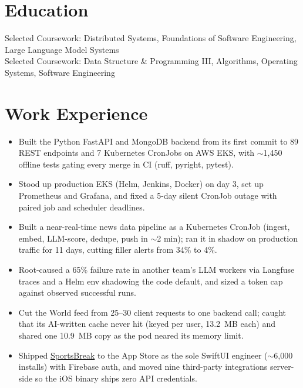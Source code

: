 \documentclass[11pt, letterpaper]{article}
\begin{document}

\section{Education}
Selected Coursework: Distributed Systems, Foundations of Software Engineering, Large Language Model Systems\\[1pt]
Selected Coursework: Data Structure \& Programming III, Algorithms, Operating Systems, Software Engineering

\section{Work Experience}
\begin{itemize}
  \item Built the Python FastAPI and MongoDB backend from its first commit to 89 REST endpoints and 7 Kubernetes CronJobs on AWS EKS, with $\sim$1{,}450 offline tests gating every merge in CI (ruff, pyright, pytest).
  \item Stood up production EKS (Helm, Jenkins, Docker) on day 3, set up Prometheus and Grafana, and fixed a 5-day silent CronJob outage with paired job and scheduler deadlines.
  \item Built a near-real-time news data pipeline as a Kubernetes CronJob (ingest, embed, LLM-score, dedupe, push in $\sim$2 min); ran it in shadow on production traffic for 11 days, cutting filler alerts from 34\% to 4\%.
  \item Root-caused a 65\% failure rate in another team's LLM workers via Langfuse traces and a Helm env shadowing the code default, and sized a token cap against observed successful runs.
  \item Cut the World feed from 25--30 client requests to one backend call; caught that its AI-written cache never hit (keyed per user, 13.2~MB each) and shared one 10.9~MB copy as the pod neared its memory limit.
  \item Shipped \href{https://apps.apple.com/app/id6762649287}{SportsBreak} to the App Store as the sole SwiftUI engineer ($\sim$6{,}000 installs) with Firebase auth, and moved nine third-party integrations server-side so the iOS binary ships zero API credentials.
\end{itemize}
\end{document}
